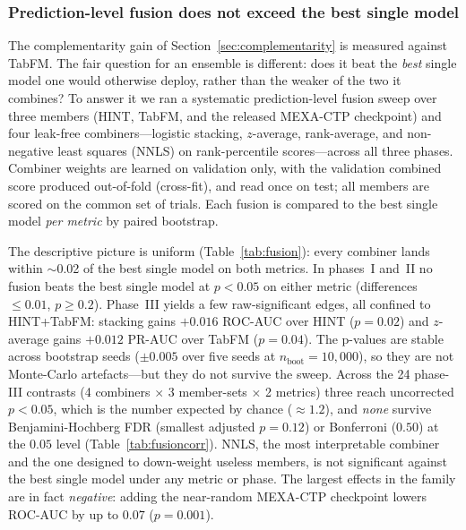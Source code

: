 \documentclass[a4paper,fleqn]{cas-sc}
\begin{document}
\subsubsection{Prediction-level fusion does not exceed the best single model}
\label{sec:optionb}
The complementarity gain of Section~\ref{sec:complementarity} is measured against TabFM. The
fair question for an ensemble is different: does it beat the \emph{best} single model one
would otherwise deploy, rather than the weaker of the two it combines? To answer it we ran a
systematic prediction-level fusion sweep over three members (HINT, TabFM, and the released
MEXA-CTP checkpoint) and four leak-free combiners---logistic stacking, $z$-average,
rank-average, and non-negative least squares (NNLS) on rank-percentile scores---across all
three phases. Combiner weights are learned on validation only, with the validation combined
score produced out-of-fold (cross-fit), and read once on test; all members are scored on the
common set of trials. Each fusion is compared to the best single model \emph{per metric} by
paired bootstrap.

The descriptive picture is uniform (Table~\ref{tab:fusion}): every combiner lands within
$\sim$0.02 of the best single model on both metrics. In phases~I and~II no fusion beats the
best single model at $p<0.05$ on either metric (differences $\le 0.01$, $p\ge 0.2$). Phase~III
yields a few raw-significant edges, all confined to HINT+TabFM: stacking gains $+0.016$
ROC-AUC over HINT ($p=0.02$) and $z$-average gains $+0.012$ PR-AUC over TabFM ($p=0.04$). The
p-values are stable across bootstrap seeds ($\pm0.005$ over five seeds at $n_{\text{boot}}{=}10{,}000$),
so they are not Monte-Carlo artefacts---but they do not survive the sweep. Across the 24
phase-III contrasts (4 combiners $\times$ 3 member-sets $\times$ 2 metrics) three reach
uncorrected $p<0.05$, which is the number expected by chance ($\approx1.2$), and
\emph{none} survive Benjamini-Hochberg FDR (smallest adjusted $p=0.12$) or Bonferroni
($0.50$) at the $0.05$ level (Table~\ref{tab:fusioncorr}). NNLS, the most interpretable
combiner and the one designed to down-weight useless members, is not significant against the
best single model under any metric or phase. The largest effects in the family are in fact
\emph{negative}: adding the near-random MEXA-CTP checkpoint lowers ROC-AUC by up to $0.07$
($p=0.001$).
\end{document}
